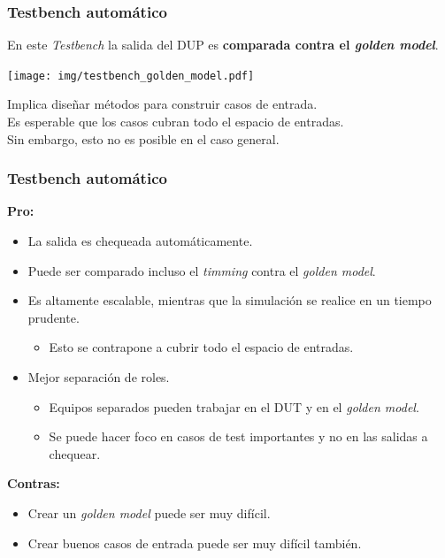 \documentclass[aspectratio=169]{beamer}
\begin{document}
\begin{frame}[fragile,t]
    \frametitle{Testbench automático}
    En este \emph{Testbench} la salida del DUP es \textbf{comparada contra el \emph{golden model}}.
    \begin{center}
    \texttt{[image: img/testbench\_golden\_model.pdf]}
    \end{center}
    \pause
    Implica diseñar métodos para construir casos de entrada.\\
    \bigskip
    \textcolor{verdeuca}{Es esperable que los casos cubran todo el espacio de entradas.}\\
    \textcolor{rojo}{Sin embargo, esto no es posible en el caso general.}
\end{frame}

\begin{frame}[fragile,t]
    \frametitle{Testbench automático}
    \textcolor{v}{\textbf{Pro:}}\\
    \begin{itemize}
    \item La salida es chequeada automáticamente.
    \item Puede ser comparado incluso el \emph{timming} contra el \emph{golden model}.
    \item Es altamente escalable, mientras que la simulación se realice en un tiempo prudente.
    \begin{itemize}
     \item \textcolor{verdeuca}{Esto se contrapone a cubrir todo el espacio de entradas.}
    \end{itemize}
    \item Mejor separación de roles.
    \begin{itemize}
    \item \textcolor{verdeuca}{Equipos separados pueden trabajar en el DUT y en el \emph{golden model}.}
    \item \textcolor{verdeuca}{Se puede hacer foco en casos de test importantes y no en las salidas a chequear.}
    \end{itemize}
    \end{itemize}
    \pause
    \textcolor{r}{\textbf{Contras:}}\\
    \begin{itemize}
    \item Crear un \emph{golden model} puede ser muy difícil.
    \item Crear buenos casos de entrada puede ser muy difícil también.
    \end{itemize}
\end{frame}
\end{document}
